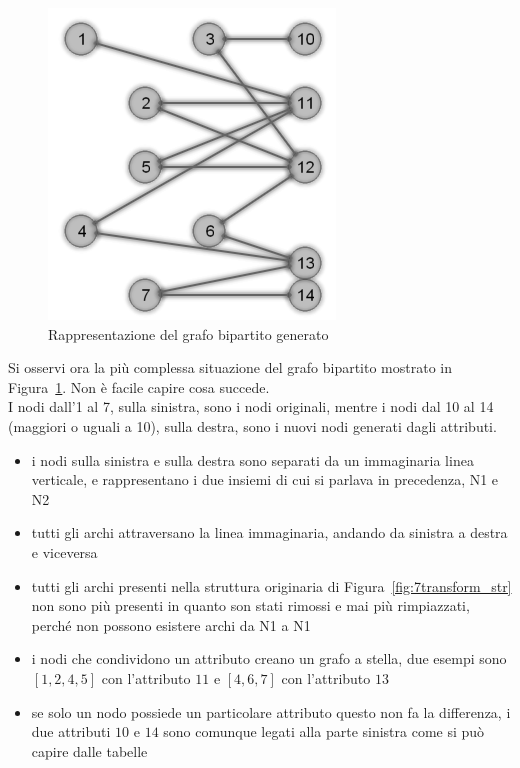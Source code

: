 %
\begin{figure}[htp]
	\centering
	\includegraphics{immagini/7transform_bipartite}
	\caption{Rappresentazione del grafo bipartito generato}
	\label{fig:7transform_bipartite}
\end{figure}
%
Si osservi ora la più complessa situazione del grafo bipartito mostrato in Figura~\ref{fig:7transform_bipartite}. Non è facile capire cosa succede.\\
I nodi dall'1 al 7, sulla sinistra, sono i nodi originali, mentre i nodi dal 10 al 14 (maggiori o uguali a 10), sulla destra, sono i nuovi nodi generati dagli attributi.
\begin{itemize}
	\item i nodi sulla sinistra e sulla destra sono separati da un immaginaria linea verticale, e rappresentano i due insiemi di cui si parlava in precedenza, N1 e N2
	\item tutti gli archi attraversano la linea immaginaria, andando da sinistra a destra e viceversa
	\item tutti gli archi presenti nella struttura originaria di Figura~\ref{fig:7transform_str} non sono più presenti in quanto son stati rimossi e mai più rimpiazzati, perché non possono esistere archi da N1 a N1
	\item i nodi che condividono un attributo creano un grafo a stella, due esempi sono $[1,2,4,5]$ con l'attributo $11$ e $[4,6,7]$ con l'attributo $13$
	\item se solo un nodo possiede un particolare attributo questo non fa la differenza, i due attributi $10$ e $14$ sono comunque legati alla parte sinistra come si può capire dalle tabelle
\end{itemize}
%



